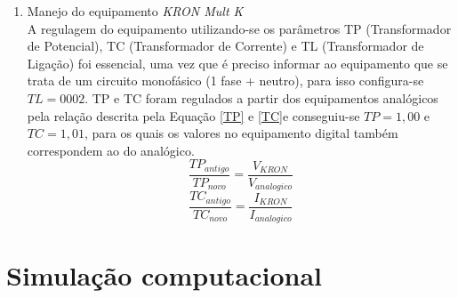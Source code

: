 \documentclass[a4paper,12pt,oneside,openany,table,xcdraw]{article}
\begin{document}
\begin{enumerate}[1 - ]
\item Manejo do equipamento \emph{KRON Mult K}\\
A regulagem do equipamento utilizando-se os parâmetros TP (Transformador de Potencial), TC (Transformador de Corrente) e TL (Transformador de Ligação) foi essencial, uma vez que é preciso informar ao equipamento que se trata de um circuito monofásico (1 fase + neutro), para isso configura-se $TL=0002$. TP e TC foram regulados a partir dos equipamentos analógicos pela relação descrita pela Equação \ref{TP} e \ref{TC}e conseguiu-se $TP=1,00$ e $TC=1,01$, para os quais os valores no equipamento digital também correspondem ao do analógico.
\begin{equation}\label{TP}
\dfrac{{TP}_{antigo}}{{TP}_{novo}}=\dfrac{V_{KRON}}{V_{analogico}}
\end{equation}
\begin{equation}\label{TC}
\dfrac{{TC}_{antigo}}{{TC}_{novo}}=\dfrac{I_{KRON}}{I_{analogico}}
\end{equation}

\end{enumerate}


\section{Simulação computacional} %
\end{document}

